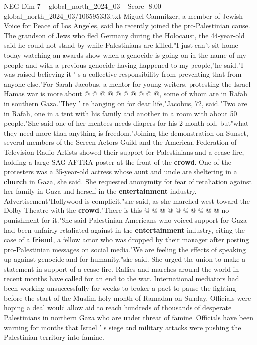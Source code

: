 \begin{textsample}{NEG Dim 7 – global\_north\_2024\_03 – Score -8.00 – global\_north\_2024\_03/106595333.txt}
Miguel Camnitzer, a member of Jewish Voice for Peace of Los Angeles, said he recently joined the pro-Palestinian cause.
The grandson of Jews who fled Germany during the Holocaust, the 44-year-old said he could not stand by while Palestinians are killed."I just can't sit home today watching an awards show when a genocide is going on in the name of my people and with a previous genocide having happened to my people,"he said."I was raised believing it ' s a collective responsibility from preventing that from anyone else."For Sarah Jacobus, a mentor for young writers, protesting the Israel-Hamas war is more about @ @ @ @ @ @ @ @ @ @, some of whom are in Rafah in southern Gaza."They ' re hanging on for dear life,"Jacobus, 72, said."Two are in Rafah, one in a tent with his family and another in a room with about 50 people."She said one of her mentees needs diapers for his 2-month-old, but"what they need more than anything is freedom."Joining the demonstration on Sunset, several members of the Screen Actors Guild and the American Federation of Television Radio Artists showed their support for Palestinians and a cease-fire, holding a large SAG-AFTRA poster at the front of the \textbf{crowd}.
One of the protesters was a 35-year-old actress whose aunt and uncle are sheltering in a \textbf{church} in Gaza, she said.
She requested anonymity for fear of retaliation against her family in Gaza and herself in the \textbf{entertainment} industry.
Advertisement"Hollywood is complicit,"she said, as she marched west toward the Dolby Theatre with the \textbf{crowd}."There is this @ @ @ @ @ @ @ @ @ @ no punishment for it."She said Palestinian Americans who voiced support for Gaza had been unfairly retaliated against in the \textbf{entertainment} industry, citing the case of a \textbf{friend}, a fellow actor who was dropped by their manager after posting pro-Palestinian messages on social media."We are feeling the effects of speaking up against genocide and for humanity,"she said.
She urged the union to make a statement in support of a cease-fire.
Rallies and marches around the world in recent months have called for an end to the war.
International mediators had been working unsuccessfully for weeks to broker a pact to pause the fighting before the start of the Muslim holy month of Ramadan on Sunday.
Officials were hoping a deal would allow aid to reach hundreds of thousands of desperate Palestinians in northern Gaza who are under threat of famine.
Officials have been warning for months that Israel ' s siege and military attacks were pushing the Palestinian territory into famine.

\end{textsample}
